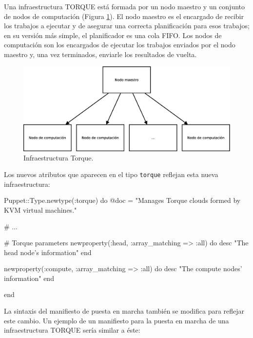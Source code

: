 Una infraestructura TORQUE está formada por un nodo maestro y un conjunto de nodos de computación (Figura \ref{figure:arquitectura-torque}). El nodo maestro es el encargado de recibir los trabajos a ejecutar y de asegurar una correcta planificación para esos trabajos; en su versión más simple, el planificador es una cola FIFO. Los nodos de computación son los encargados de ejecutar los trabajos enviados por el nodo maestro y, una vez terminados, enviarle los resultados de vuelta. \\

\begin{figure} [!htbp]
  \centering
  \includegraphics[width=13.5cm]{figuras/Arquitectura_Torque.eps}
  \caption{Infraestructura Torque.}
\label{figure:arquitectura-torque}
\end{figure}

\pagebreak

Los nuevos atributos que aparecen en el tipo \texttt{torque} reflejan esta nueva infraestructura:

\begin{rubycode}
Puppet::Type.newtype(:torque) do
   @doc = "Manages Torque clouds formed by KVM virtual machines."
   
   # ...

   # Torque parameters
   newproperty(:head, :array_matching => :all) do
      desc "The head node's information"
   end
   
   newproperty(:compute, :array_matching => :all) do
      desc "The compute nodes' information"
   end
   
end
\end{rubycode}

La sintaxis del manifiesto de puesta en marcha también se modifica para reflejar este cambio. Un ejemplo de un manifiesto para la puesta en marcha de una infraestructura TORQUE sería similar a éste:

